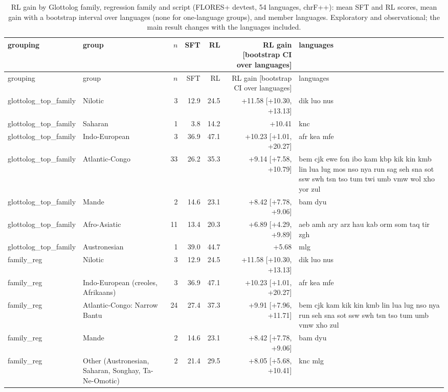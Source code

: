 {\tiny\setlength{\tabcolsep}{1pt}
\begin{longtable}{@{}llrrrrp{4.3cm}@{}}
\caption{RL gain by Glottolog family, regression family and script (FLORES+ devtest, 54 languages, chrF++): mean SFT and RL scores, mean gain with a bootstrap interval over languages (none for one-language groups), and member languages. Exploratory and observational; the main result changes with the languages included.}\label{tab:family-gain}\\
\toprule
grouping & group & $n$ & SFT & RL & RL gain [bootstrap CI over languages] & languages \\
\midrule\endfirsthead
\toprule
grouping & group & $n$ & SFT & RL & RL gain [bootstrap CI over languages] & languages \\
\midrule\endhead
\midrule\endfoot
\bottomrule\endlastfoot
glottolog\_top\_family & Nilotic & 3 & 12.9 & 24.5 & +11.58 [+10.30, +13.13] & dik luo nus \\
glottolog\_top\_family & Saharan & 1 & 3.8 & 14.2 & +10.41 & knc \\
glottolog\_top\_family & Indo-European & 3 & 36.9 & 47.1 & +10.23 [+1.01, +20.27] & afr kea mfe \\
glottolog\_top\_family & Atlantic-Congo & 33 & 26.2 & 35.3 & +9.14 [+7.58, +10.79] & bem cjk ewe fon ibo kam kbp kik kin kmb lin lua lug mos nso nya run sag seh sna sot ssw swh tsn tso tum twi umb vmw wol xho yor zul \\
glottolog\_top\_family & Mande & 2 & 14.6 & 23.1 & +8.42 [+7.78, +9.06] & bam dyu \\
glottolog\_top\_family & Afro-Asiatic & 11 & 13.4 & 20.3 & +6.89 [+4.29, +9.89] & aeb amh ary arz hau kab orm som taq tir zgh \\
glottolog\_top\_family & Austronesian & 1 & 39.0 & 44.7 & +5.68 & mlg \\
family\_reg & Nilotic & 3 & 12.9 & 24.5 & +11.58 [+10.30, +13.13] & dik luo nus \\
family\_reg & Indo-European (creoles, Afrikaans) & 3 & 36.9 & 47.1 & +10.23 [+1.01, +20.27] & afr kea mfe \\
family\_reg & Atlantic-Congo: Narrow Bantu & 24 & 27.4 & 37.3 & +9.91 [+7.96, +11.71] & bem cjk kam kik kin kmb lin lua lug nso nya run seh sna sot ssw swh tsn tso tum umb vmw xho zul \\
family\_reg & Mande & 2 & 14.6 & 23.1 & +8.42 [+7.78, +9.06] & bam dyu \\
family\_reg & Other (Austronesian, Saharan, Songhay, Ta-Ne-Omotic) & 2 & 21.4 & 29.5 & +8.05 [+5.68, +10.41] & knc mlg \\

\end{longtable}}
